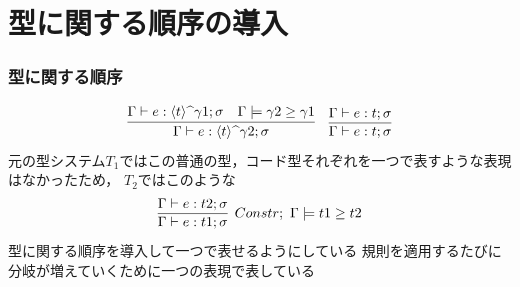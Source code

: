 \section{型に関する順序の導入}

\begin{frame}
  \frametitle{型に関する順序}
  \[
    \infer
    {\Gamma \vdash e : \codeTs{t}{\gamma2} ; \sigma}
    {\Gamma \vdash e : \codeTs{t}{\gamma1} ; \sigma
      & \Gamma \models \gamma2 \ord \gamma1
    }
    \quad
    \infer
    {\Gamma \vdash e : t ; \sigma}
    {\Gamma \vdash e : t ; \sigma}
  \]
  元の型システム$T_1$ではこの普通の型，コード型それぞれを一つで表すような表現はなかったため，
  $T_2$ではこのような
  \[
    \infer[Constr;~ \Gamma \models \longer{t1}{t2}]
    {\Gamma \vdash e : t1 ; \sigma}
    {\Gamma \vdash e : t2 ; \sigma}
  \]
  型に関する順序を導入して一つで表せるようにしている
  規則を適用するたびに分岐が増えていくために一つの表現で表している
\end{frame}

